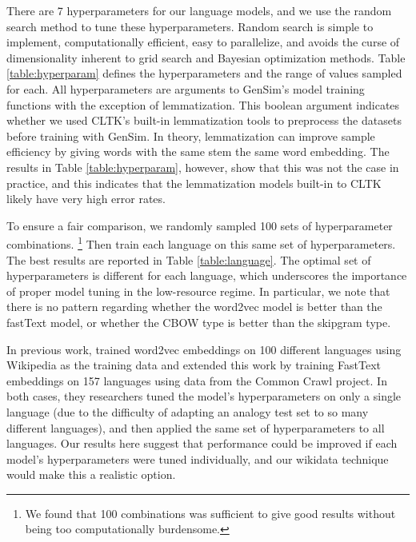 \documentclass[11pt,a4paper]{article}
\begin{document}
There are 7 hyperparameters for our language models,
and we use the random search method \citep{bergstra2012random} to tune these hyperparameters.
Random search is simple to implement, computationally efficient, easy to parallelize, and avoids the curse of dimensionality inherent to grid search and Bayesian optimization methods.
Table \ref{table:hyperparam} defines the hyperparameters and the range of values sampled for each.
All hyperparameters are arguments to GenSim's model training functions with the exception of lemmatization.
This boolean argument indicates whether we used CLTK's built-in lemmatization tools to preprocess the datasets before training with GenSim.
In theory, lemmatization can improve sample efficiency by giving words with the same stem the same word embedding.
The results in Table \ref{table:hyperparam}, however, show that this was not the case in practice,
and this indicates that the lemmatization models built-in to CLTK likely have very high error rates.

To ensure a fair comparison,
we randomly sampled 100 sets of hyperparameter combinations.%
\footnote{We found that 100 combinations was sufficient to give good results without being too computationally burdensome.}
Then train each language on this same set of hyperparameters.
The best results are reported in Table \ref{table:language}.
The optimal set of hyperparameters is different for each language,
which underscores the importance of proper model tuning in the low-resource regime.
In particular, we note that there is no pattern regarding whether the word2vec model is better than the fastText model, or whether the CBOW type is better than the skipgram type.

In previous work, 
\citet{al2013polyglot} trained word2vec embeddings on 100 different languages using Wikipedia as the training data and 
\citet{grave2018learning} extended this work by training FastText embeddings on 157 languages using data from the Common Crawl project.
In both cases, they researchers tuned the model's hyperparameters on only a single language (due to the difficulty of adapting an analogy test set to so many different languages),
and then applied the same set of hyperparameters to all languages.
Our results here suggest that performance could be improved if each model's hyperparameters were tuned individually,
and our wikidata technique would make this a realistic option.
\end{document}
